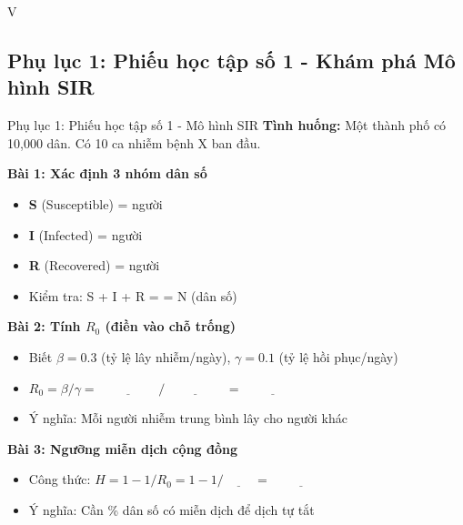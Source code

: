 \documentclass[12pt,a4paper]{article}
\begin{document}
\begin{competitionsection}{V}
\vspace{0.5cm}
\subsection*{Phụ lục 1: Phiếu học tập số 1 - Khám phá Mô hình SIR}
\begin{phieuhoc_tap_box}{Phụ lục 1: Phiếu học tập số 1 - Mô hình SIR}
\textbf{Tình huống:} Một thành phố có 10,000 dân. Có 10 ca nhiễm bệnh X ban đầu.

\vspace{0.5cm}
\textbf{Bài 1: Xác định 3 nhóm dân số}
\begin{itemize}[leftmargin=*,noitemsep]
\item \textbf{S} (Susceptible) = \underline{\hspace{6cm}} người
\item \textbf{I} (Infected) = \underline{\hspace{6cm}} người
\item \textbf{R} (Recovered) = \underline{\hspace{6cm}} người
\item Kiểm tra: S + I + R = \underline{\hspace{2cm}} = N (dân số)
\end{itemize}

\textbf{Bài 2: Tính $R_0$ (điền vào chỗ trống)}
\begin{itemize}[leftmargin=*,noitemsep]
\item Biết $\beta = 0.3$ (tỷ lệ lây nhiễm/ngày), $\gamma = 0.1$ (tỷ lệ hồi phục/ngày)
\item $R_0 = \beta / \gamma = \underline{\hspace{2cm}} / \underline{\hspace{2cm}} = \underline{\hspace{2cm}}$
\item Ý nghĩa: Mỗi người nhiễm trung bình lây cho \underline{\hspace{2cm}} người khác
\end{itemize}

\textbf{Bài 3: Ngưỡng miễn dịch cộng đồng}
\begin{itemize}[leftmargin=*,noitemsep]
\item Công thức: $H = 1 - 1/R_0 = 1 - 1/\underline{\hspace{1cm}} = \underline{\hspace{2cm}}$
\item Ý nghĩa: Cần \underline{\hspace{2cm}}\% dân số có miễn dịch để dịch tự tắt
\end{itemize}


\end{phieuhoc_tap_box}
\end{competitionsection}
\end{document}
